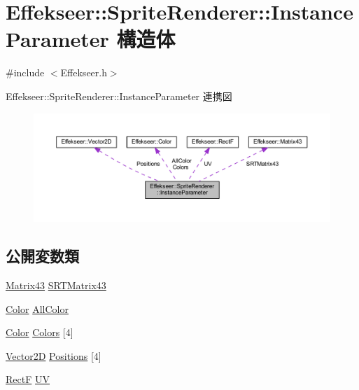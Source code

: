 \hypertarget{struct_effekseer_1_1_sprite_renderer_1_1_instance_parameter}{}\section{Effekseer\+:\+:Sprite\+Renderer\+:\+:Instance\+Parameter 構造体}
\label{struct_effekseer_1_1_sprite_renderer_1_1_instance_parameter}


{\ttfamily \#include $<$Effekseer.\+h$>$}



Effekseer\+:\+:Sprite\+Renderer\+:\+:Instance\+Parameter 連携図\nopagebreak
\begin{figure}[H]
\begin{center}
\leavevmode
\includegraphics[width=350pt]{struct_effekseer_1_1_sprite_renderer_1_1_instance_parameter__coll__graph}
\end{center}
\end{figure}
\subsection*{公開変数類}
\begin{DoxyCompactItemize}
\item 
\mbox{\hyperlink{struct_effekseer_1_1_matrix43}{Matrix43}} \mbox{\hyperlink{struct_effekseer_1_1_sprite_renderer_1_1_instance_parameter_ac25f3a2b7f290ac99b8c50b0eaf92339}{S\+R\+T\+Matrix43}}
\item 
\mbox{\hyperlink{struct_effekseer_1_1_color}{Color}} \mbox{\hyperlink{struct_effekseer_1_1_sprite_renderer_1_1_instance_parameter_a7160592889f3f59c114094b3cc8f9cd5}{All\+Color}}
\item 
\mbox{\hyperlink{struct_effekseer_1_1_color}{Color}} \mbox{\hyperlink{struct_effekseer_1_1_sprite_renderer_1_1_instance_parameter_ae745017c89a18992eecfcc14c4f5f763}{Colors}} \mbox{[}4\mbox{]}
\item 
\mbox{\hyperlink{struct_effekseer_1_1_vector2_d}{Vector2D}} \mbox{\hyperlink{struct_effekseer_1_1_sprite_renderer_1_1_instance_parameter_a6182e946041958ddc8e63b59165a9249}{Positions}} \mbox{[}4\mbox{]}
\item 
\mbox{\hyperlink{struct_effekseer_1_1_rect_f}{RectF}} \mbox{\hyperlink{struct_effekseer_1_1_sprite_renderer_1_1_instance_parameter_aedec84f7ebb3f45f2a8057990f3907ba}{UV}}
\end{DoxyCompactItemize}


